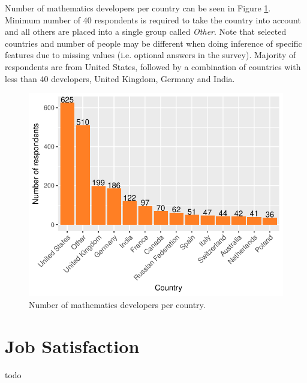\documentclass{article}
\begin{document}
\vspace{2mm}

Number of mathematics developers per country can be seen in Figure \ref{fig_0}. Minimum number of 40 respondents is required to take the country into account and all others are placed into a single group called \textit{Other}. Note that selected countries and number of people may be different when doing inference of specific features due to missing values (i.e. optional answers in the survey). Majority of respondents are from United States, followed by a combination of countries with less than 40 developers, United Kingdom, Germany and India.


\begin{figure}[H]
\centering
\includegraphics{report-005}
\caption{Number of mathematics developers per country.}\label{fig_0}
\end{figure}

\section{Job Satisfaction}
todo
\end{document}
